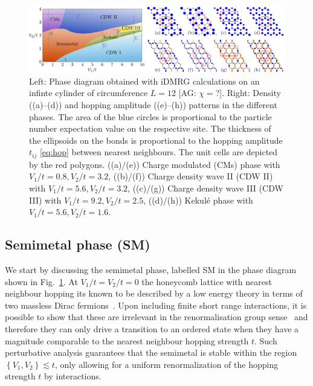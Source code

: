 \documentclass[aps,prx,10pt,twocolumn,floatfix,superscriptaddress,showpacs,numerical,footinbib]{revtex4-1}
\newcommand{\noteAG}[1]{{\color{blue} [AG: #1]}}
\begin{document}
\begin{figure}
 \includegraphics[width=\textwidth]{pdf/phase_diagram_ext.pdf}
 \caption{Left: Phase diagram obtained with iDMRG calculations on an infinte cylinder of circumference $L=12$ \noteAG{$\chi=$?}. 
 Right: Density ((a)--(d)) and hopping amplitude ((e)--(h)) patterns in the different phases. 
 The area of the blue circles is proportional to the particle number expectation value on the respective site. 
 The thickness of the ellipsoids on the bonds is proportional to the hopping amplitude $t_{ij}$ \eqref{eq:hop} between nearest neighbours.
 The unit cells are depicted by the red polygons. 
 ((a)/(e)) Charge modulated (CMs) phase with $V_1/t = 0.8, V_2/t = 3.2 $, ((b)/(f)) Charge density wave II (CDW II) with $V_1/t = 5.6, V_2/t = 3.2$,  ((c)/(g)) Charge density wave III (CDW III) with $V_1/t = 9.2, V_2/t = 2.5$, ((d)/(h)) Kekul\'e phase with $V_1/t = 5.6, V_2/t = 1.6 $. 
 \label{fig:phase diagram}}
\end{figure}


%
\subsection{Semimetal phase (SM)}
%
We start by discussing the semimetal phase, labelled SM in the phase diagram shown in Fig.~\ref{fig:phase diagram}.
%
At $V_{1}/t=V_{2}/t=0$ the honeycomb lattice with nearest neighbour hopping its 
known to be described by a low energy theory in terms of two massless Dirac fermions~\cite{CastroNeto2009}.
%
Upon including finite short range interactions, it is possible to show that these are irrelevant in the renormalisation group sense~\cite{S94,KUP12} 
and therefore they can only drive a transition to an ordered state when they have a magnitude comparable to the nearest neighbour hopping strength $t$.
%
Such perturbative analysis guarantees that the semimetal is stable within
the region $\left\lbrace V_{1},V_{2}\right\rbrace \lesssim t$, only allowing for a uniform renormalization 
of the hopping strength $t$ by interactions.\\
\end{document}
